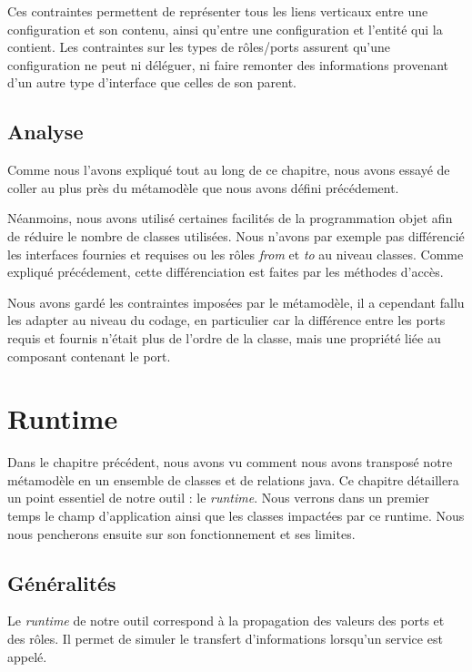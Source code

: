             Ces contraintes permettent de représenter tous les liens verticaux entre une configuration et son contenu, ainsi qu'entre une configuration et l'entité qui la contient. Les contraintes sur les types de rôles/ports assurent qu'une configuration ne peut ni déléguer, ni faire remonter des informations provenant d'un autre type d'interface que celles de son parent.
            
	\section{Analyse}
    	Comme nous l'avons expliqué tout au long de ce chapitre, nous avons essayé de coller au plus près du métamodèle que nous avons défini précédement.
        \newline
        
        Néanmoins, nous avons utilisé certaines facilités de la programmation objet afin de réduire le nombre de classes utilisées. Nous n'avons par exemple pas différencié les interfaces fournies et requises ou les rôles \emph{from} et \emph{to} au niveau classes. Comme expliqué précédement, cette différenciation est faites par les méthodes d'accès.
        \newline
        
        Nous avons gardé les contraintes imposées par le métamodèle, il a cependant fallu les adapter au niveau du codage, en particulier car la différence entre les ports requis et fournis n'était plus de l'ordre de la classe, mais une propriété liée au composant contenant le port.
        
\chapter{Runtime}
\label{runtime-chapter}

	Dans le chapitre précédent, nous avons vu comment nous avons transposé notre métamodèle en un ensemble de classes et de relations java. Ce chapitre détaillera un point essentiel de notre outil : le \emph{runtime}. Nous verrons dans un premier temps le champ d'application ainsi que les classes impactées par ce runtime. Nous nous pencherons ensuite sur son fonctionnement et ses limites.
    
    \section{Généralités}
    	Le \emph{runtime} de notre outil correspond à la propagation des valeurs des ports et des rôles. Il permet de simuler le transfert d'informations lorsqu'un service est appelé.
        \newline
        
